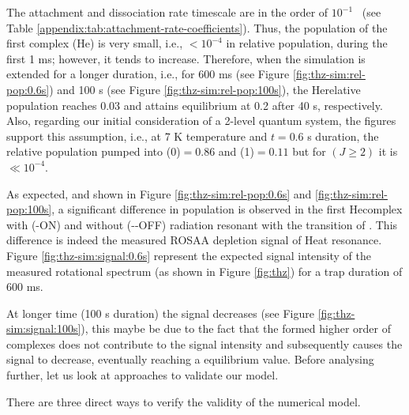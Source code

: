 % 


The attachment and dissociation rate timescale are in the order of $10^{-1}$
\pers\ (see Table \ref{appendix:tab:attachment-rate-coefficients}). Thus, the
population of the first complex (He\CD) is very small, i.e., $<10^{-4}$ in relative
population, during the first 1 ms; however, it tends to increase. Therefore,
when the simulation is extended for a longer duration, i.e., for 600 ms (see
Figure \ref{fig:thz-sim:rel-pop:0.6s}) and 100 s (see Figure
\ref{fig:thz-sim:rel-pop:100s}), the He\CD relative population reaches 0.03 and
attains equilibrium at 0.2 after 40 s, respectively. Also, regarding our initial
consideration of a 2-level quantum system, the figures
support this assumption, i.e., at 7 K temperature and $t=0.6$ s duration, 
the relative population pumped into \CD(0)$=0.86$ and \CD(1)$=0.11$ 
but for \CD$(J\geq 2)$ it is $\ll 10^{-4}$.

As expected, and shown in Figure \ref{fig:thz-sim:rel-pop:0.6s} and
\ref{fig:thz-sim:rel-pop:100s}, a significant difference in population is
observed in the first He\CD complex with (-ON) and without (-\--OFF) radiation resonant 
with the \CDline transition of \CD. This difference is indeed the measured ROSAA 
depletion signal of He\CD at resonance. Figure \ref{fig:thz-sim:signal:0.6s} represent 
the expected signal intensity of the measured rotational spectrum (as shown in Figure \ref{fig:thz}) 
for a trap duration of 600 ms.

At longer time (100 s duration) the signal decreases (see Figure \ref{fig:thz-sim:signal:100s}),
this maybe be due to the fact that the formed higher order of complexes 
does not contribute to the signal intensity and subsequently causes the signal to decrease, 
eventually reaching a equilibrium value. 
Before analysing further, let us look at approaches to validate our model.


There are three direct ways to verify the validity of the numerical model.

